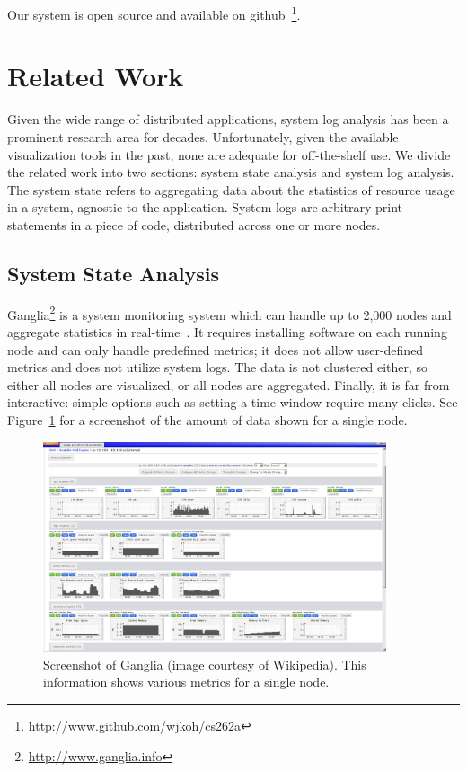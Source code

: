\documentclass[conference]{style/acmsiggraph}
\begin{document}
Our system is open source and available on github~\footnote{\url{http://www.github.com/wjkoh/cs262a}}.


\section{Related Work}
Given the wide range of distributed applications, system log analysis has been a prominent research area for decades.
Unfortunately, given the available visualization tools in the past, none are adequate for off-the-shelf use.
We divide the related work into two sections: system state analysis and system log analysis.
The system state refers to aggregating data about the statistics of resource usage in a system, agnostic to the application.
System logs are arbitrary print statements in a piece of code, distributed across one or more nodes.

\subsection{System State Analysis}
Ganglia\footnote{\url{http://www.ganglia.info}} is a system monitoring system which can handle up to 2,000 nodes and aggregate statistics in real-time~\cite{Massie04}.
It requires installing software on each running node and can only handle predefined metrics; it does not allow user-defined metrics and does not utilize system logs.
The data is not clustered either, so either all nodes are visualized, or all nodes are aggregated.
Finally, it is far from interactive: simple options such as setting a time window require many clicks.
See Figure~\ref{fig:ganglia} for a screenshot of the amount of data shown for a single node.

\begin{figure}[h]
    \centering
    \includegraphics[width=0.9\textwidth]{images/ganglia.png}
    \caption{Screenshot of Ganglia (image courtesy of Wikipedia). This information shows various metrics for a single node.}
    \label{fig:ganglia}
\end{figure}
\end{document}
